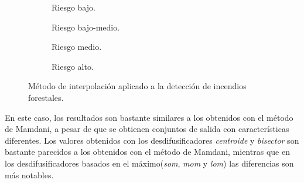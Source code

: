 \begin{figure}[t]
	\centering
	\begin{subfigure}[b]{0.45\textwidth}
		\setlength\figureheight{3cm}
		\setlength\figurewidth{6cm}
		
		\caption{Riesgo bajo.}\label{fig:fire-detection-interpolation-low}
	\end{subfigure}
	\qquad
	\begin{subfigure}[b]{0.45\textwidth}
		\setlength\figureheight{3cm}
		\setlength\figurewidth{6cm}
		
		\caption{Riesgo bajo-medio.}\label{fig:fire-detection-interpolation-low-medium}
	\end{subfigure}
	
	\vspace{1cm}
	\begin{subfigure}[b]{0.45\textwidth}
		\setlength\figureheight{3cm}
		\setlength\figurewidth{6cm}
		
		\caption{Riesgo medio.}\label{fig:fire-detection-interpolation-medium}
	\end{subfigure}
	\qquad
	\begin{subfigure}[b]{0.45\textwidth}
		\setlength\figureheight{3cm}
		\setlength\figurewidth{6cm}
		
		\caption{Riesgo alto.}\label{fig:fire-detection-interpolation-high}
	\end{subfigure}
	\caption{Método de interpolación aplicado a la detección de incendios forestales.}
	\label{fig:interpolation-fire-detection-example}
\end{figure}

En este caso, los resultados son bastante similares a los obtenidos con el método de Mamdani, a pesar de que se obtienen conjuntos de salida con características diferentes. Los valores obtenidos con los desdifusificadores \emph{centroide} y \emph{bisector} son bastante parecidos a los obtenidos con el método de Mamdani, mientras que en los desdifusificadores basados en el máximo(\emph{som}, \emph{mom} y \emph{lom}) las diferencias son más notables.
